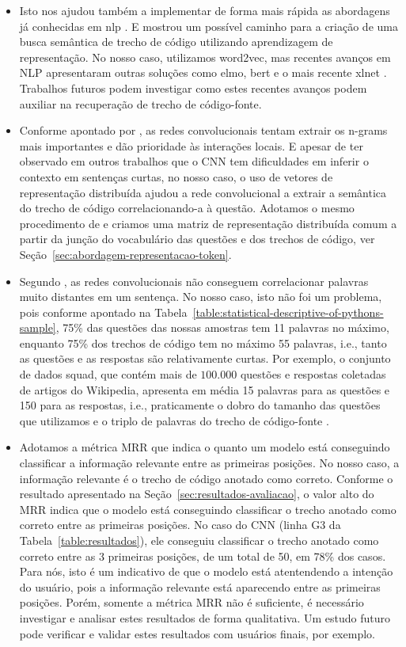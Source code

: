 \begin{itemize}
    \item Isto nos ajudou também a implementar de forma mais rápida as abordagens já conhecidas em \acrshort{nlp} \citep{feng-2015, tan-lstm-qa}. E mostrou um possível caminho para a criação de uma busca semântica de trecho de código utilizando aprendizagem de representação. No nosso caso, utilizamos \Gls{word2vec}, mas recentes avanços em NLP apresentaram outras soluções como \acrshort{elmo}, \acrshort{bert} e o mais recente \Gls{xlnet} \citep{yang2019xlNet, devlin-etal-2019-bert}. Trabalhos futuros podem investigar como estes recentes avanços podem auxiliar na recuperação de trecho de código-fonte.
    \item Conforme apontado por \cite{tom-young:trends-deep-learning-nlp}, as redes convolucionais tentam extrair os n-grams mais importantes e dão prioridade às interações locais. E apesar de \cite{tom-young:trends-deep-learning-nlp} ter observado em outros trabalhos que o CNN tem dificuldades em inferir o contexto em sentenças curtas, no nosso caso, o uso de vetores de representação distribuída ajudou a rede convolucional a extrair a semântica do trecho de código correlacionando-a à questão. Adotamos o mesmo procedimento de \cite{tan-lstm-qa} e criamos uma matriz de representação distribuída comum a partir da junção do vocabulário das questões e dos trechos de código, ver Seção~\ref{sec:abordagem-representacao-token}.
    \item Segundo \cite{Goodfellow-et-al-2016:convolutional-networks}, as redes convolucionais não conseguem correlacionar palavras muito distantes em um sentença. No nosso caso, isto não foi um problema, pois conforme apontado na Tabela~\ref{table:statistical-descriptive-of-pythons-sample}, 75\% das questões das nossas amostras tem 11 palavras no máximo, enquanto 75\% dos trechos de código tem no máximo 55 palavras, i.e., tanto as questões e as respostas são relativamente curtas. Por exemplo, o conjunto de dados \acrshort{squad}, que contém mais de $100.000$ questões e respostas coletadas de artigos do Wikipedia, apresenta em média 15 palavras para as questões e 150 para as respostas, i.e., praticamente o dobro do tamanho das questões que utilizamos e o triplo de palavras do trecho de código-fonte \citep{rajpurkar-etal-2016-squad}. 
    \item Adotamos a métrica MRR que indica o quanto um modelo está conseguindo classificar a informação relevante entre as primeiras posições. No nosso caso, a informação relevante é o trecho de código anotado como correto. Conforme o resultado apresentado na Seção~\ref{sec:resultados-avaliacao}, o valor alto do MRR indica que o modelo está conseguindo classificar o trecho anotado como correto entre as primeiras posições. No caso do CNN (linha G3 da Tabela~\ref{table:resultados}), ele conseguiu classificar o trecho anotado como correto entre as 3 primeiras posições, de um total de 50, em 78\% dos casos. Para nós, isto é um indicativo de que o modelo está atentendendo a intenção do usuário, pois a informação relevante está aparecendo entre as primeiras posições. Porém, somente a métrica MRR não é suficiente, é necessário investigar e analisar estes resultados de forma qualitativa. Um estudo futuro pode verificar e validar estes resultados com usuários finais, por exemplo. 
\end{itemize}


